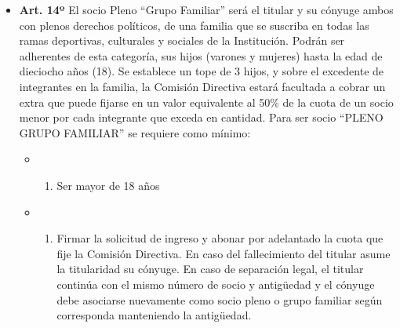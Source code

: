 \documentclass[]{book}
\providecommand{\tightlist}{%
  \setlength{\itemsep}{0pt}\setlength{\parskip}{0pt}}
\begin{document}
\begin{itemize}
\tightlist
\item
  \textbf{Art. 14º}
  El socio Pleno ``Grupo Familiar'' será el titular y su cónyuge ambos con plenos derechos políticos, de una familia que se suscriba en todas las ramas deportivas, culturales y sociales de la Institución. Podrán ser adherentes de esta categoría, sus hijos (varones y mujeres) hasta la edad de dieciocho años (18). Se establece un tope de 3 hijos, y sobre el excedente de integrantes en la familia, la Comisión Directiva estará facultada a cobrar un extra que puede fijarse en un valor equivalente al 50\% de la cuota de un socio menor por cada integrante que exceda en cantidad. Para ser socio ``PLENO GRUPO FAMILIAR'' se requiere como mínimo:

  \begin{itemize}
  \item
    \begin{enumerate}
    \def\labelenumi{\alph{enumi})}
    \tightlist
    \item
      Ser mayor de 18 años
    \end{enumerate}
  \item
    \begin{enumerate}
    \def\labelenumi{\alph{enumi})}
    \setcounter{enumi}{1}
    \tightlist
    \item
      Firmar la solicitud de ingreso y abonar por adelantado la cuota que fije la Comisión Directiva.
      En caso del fallecimiento del titular asume la titularidad su cónyuge. En caso de separación legal, el titular continúa con el mismo número de socio y antigüedad y el cónyuge debe asociarse nuevamente como socio pleno o grupo familiar según corresponda manteniendo la antigüedad.
    \end{enumerate}
  \end{itemize}
\end{itemize}
\end{document}
